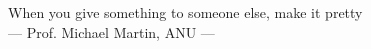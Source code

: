 \thispagestyle{empty}

\vspace*{3cm}
\normalsize
\begin{center}
When you give something to someone else, make it pretty \\ \medskip
--- Prof. Michael Martin, ANU --- \\  
\end{center}
